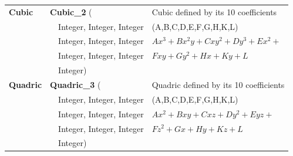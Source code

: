 \begin{ccTexOnly}
\begin{tabular}{*{3}{| l} |}
{\bf Cubic} & {\bf Cubic\_2} (        & Cubic defined by its 10 coefficients \\
      & \ \ Integer, Integer, Integer & (A,B,C,D,E,F,G,H,K,L)\\
      & \ \ Integer, Integer, Integer & \begin{math} Ax^3+Bx^2y+Cxy^2+Dy^3+Ex^2+ \end{math}\\
      & \ \ Integer, Integer, Integer & \begin{math}Fxy+Gy^2+Hx+Ky+L\end{math}\\
      & \ \ Integer)                  & \\ \hline

{\bf Quadric} & {\bf Quadric\_3} (      & Quadric defined by its 10 coefficients \\
        & \ \ Integer, Integer, Integer & (A,B,C,D,E,F,G,H,K,L)\\
        & \ \ Integer, Integer, Integer & \begin{math} Ax^2+Bxy+Cxz+Dy^2+Eyz+ \end{math}\\
        & \ \ Integer, Integer, Integer & \begin{math}Fz^2+Gx+Hy+Kz+L\end{math}\\
        & \ \ Integer)                  & \\ \hline
\end{tabular}
\end{ccTexOnly}

